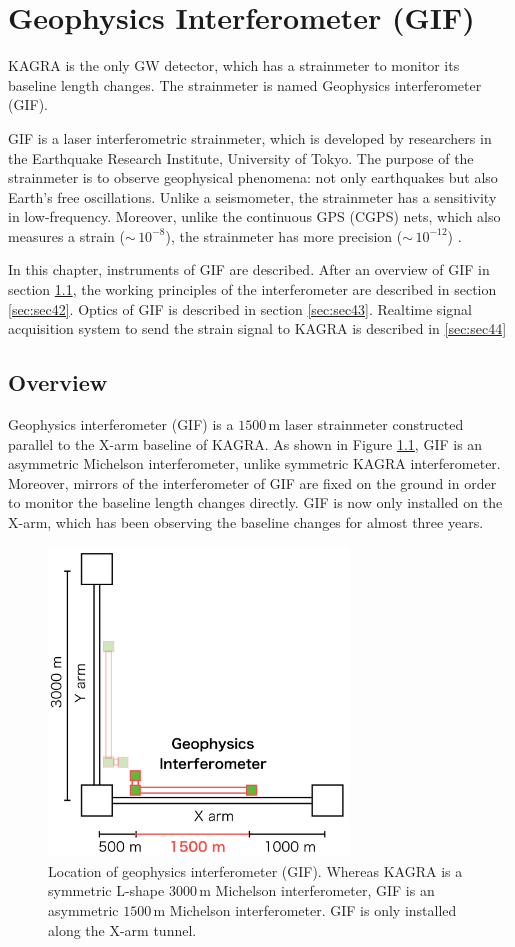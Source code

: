 \chapter{Geophysics Interferometer (GIF)} \label{chap3}
KAGRA is the only GW detector, which has a strainmeter to monitor its baseline length changes. The strainmeter is named Geophysics interferometer (GIF).

GIF is a laser interferometric strainmeter, which is developed by researchers in the Earthquake Research Institute, University of Tokyo. The purpose of the strainmeter is to observe geophysical phenomena: not only earthquakes but also Earth's free oscillations. Unlike a seismometer, the strainmeter has a sensitivity in low-frequency. Moreover, unlike the continuous GPS (CGPS) nets, which also measures a strain ($\sim\,10^{-8}$), the strainmeter has more precision ($\sim\,10^{-12}$) \cite{araya2007broadband}.

In this chapter, instruments of GIF are described. After an overview of GIF in section \cref{sec:sec41}, the working principles of the interferometer are described in section \cref{sec:sec42}. Optics of GIF is described in section \cref{sec:sec43}. Realtime signal acquisition system to send the strain signal to KAGRA is described in \cref{sec:sec44}

\section{Overview} \label{sec:sec41}
Geophysics interferometer (GIF) is a $1500\,\mathrm{m}$ laser strainmeter constructed parallel to the X-arm baseline of KAGRA. As shown in Figure \ref{img:img402}, GIF is an asymmetric Michelson interferometer, unlike symmetric KAGRA interferometer. Moreover, mirrors of the interferometer of GIF are fixed on the ground in order to monitor the baseline length changes directly. GIF is now only installed on the X-arm, which has been observing the baseline changes for almost three years.
\begin{figure}[h]
  \centering
  \includegraphics[width=8cm]{./img_chap4/img402.png}
  \caption{Location of geophysics interferometer (GIF). Whereas KAGRA is a symmetric L-shape $3000\,\mathrm{m}$ Michelson interferometer, GIF is an asymmetric $1500\,\mathrm{m}$ Michelson interferometer. GIF is only installed along the X-arm tunnel.} \label{img:img402}
\end{figure}

